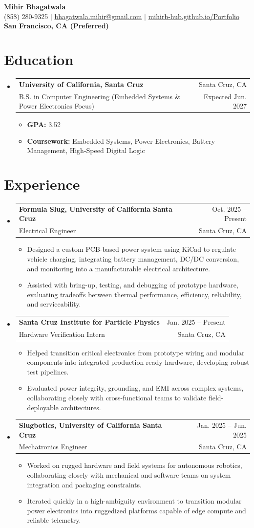 \documentclass[letterpaper,11pt]{article}
\makeatletter
\newcommand{\resumeItem}[1]{\item{#1}}
\newcommand{\resumeSubheading}[4]{
  \item
    \begin{tabular*}{0.97\textwidth}[t]{l@{\extracolsep{\fill}}r}
      \textbf{#1} & #2 \\
      #3 & #4 \\
    \end{tabular*}
}
\newcommand{\resumeSubHeadingListStart}{\begin{itemize}[label=\textbullet]}
\newcommand{\resumeSubHeadingListEnd}{\end{itemize}}
\newcommand{\resumeItemListStart}{\begin{itemize}[label=-]}
\newcommand{\resumeItemListEnd}{\end{itemize}}
\makeatother
\begin{document}
\begin{center}
  {\Large\bfseries Mihir Bhagatwala} \\
  {(858) 280-9325 $\vert$ \href{mailto:bhagatwala.mihir@gmail.com}{bhagatwala.mihir@gmail.com} $\vert$ \href{https://mihirb-hub.github.io/Portfolio/}{mihirb-hub.github.io/Portfolio}} \\
  {\textbf{San Francisco, CA (Preferred)}}
\end{center}

\section{Education}
\resumeSubHeadingListStart
  \resumeSubheading{University of California, Santa Cruz}{Santa Cruz, CA}{B.S. in Computer Engineering (Embedded Systems \& Power Electronics Focus)}{Expected Jun. 2027}
  \resumeItemListStart
    \resumeItem{\textbf{GPA:} 3.52}
    \resumeItem{\textbf{Coursework:} Embedded Systems, Power Electronics, Battery Management, High-Speed Digital Logic}
  \resumeItemListEnd
\resumeSubHeadingListEnd

\section{Experience}
\resumeSubHeadingListStart
  \resumeSubheading{Formula Slug, University of California Santa Cruz}{Oct. 2025 -- Present}{Electrical Engineer}{Santa Cruz, CA}
  \resumeItemListStart
    \resumeItem{Designed a custom PCB-based power system using KiCad to regulate vehicle charging, integrating battery management, DC/DC conversion, and monitoring into a manufacturable electrical architecture.}
    \resumeItem{Assisted with bring-up, testing, and debugging of prototype hardware, evaluating tradeoffs between thermal performance, efficiency, reliability, and serviceability.}
  \resumeItemListEnd

  \resumeSubheading{Santa Cruz Institute for Particle Physics}{Jan. 2025 -- Present}{Hardware Verification Intern}{Santa Cruz, CA}
  \resumeItemListStart
    \resumeItem{Helped transition critical electronics from prototype wiring and modular components into integrated production-ready hardware, developing robust test pipelines.}
    \resumeItem{Evaluated power integrity, grounding, and EMI across complex systems, collaborating closely with cross-functional teams to validate field-deployable architectures.}
  \resumeItemListEnd

  \resumeSubheading{Slugbotics, University of California Santa Cruz}{Jan. 2025 -- Jun. 2025}{Mechatronics Engineer}{Santa Cruz, CA}
  \resumeItemListStart
    \resumeItem{Worked on rugged hardware and field systems for autonomous robotics, collaborating closely with mechanical and software teams on system integration and packaging constraints.}
    \resumeItem{Iterated quickly in a high-ambiguity environment to transition modular power electronics into ruggedized platforms capable of edge compute and reliable telemetry.}
  \resumeItemListEnd
\resumeSubHeadingListEnd
\end{document}

